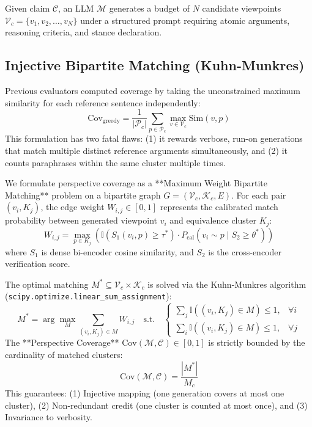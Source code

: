 \documentclass[11pt,a4paper]{article}
\begin{document}
Given claim $\mathcal{C}$, an LLM $\mathcal{M}$ generates a budget of $N$ candidate viewpoints $\mathcal{V}_c = \{v_1, v_2, \dots, v_N\}$ under a structured prompt requiring atomic arguments, reasoning criteria, and stance declaration.

\subsection{Injective Bipartite Matching (Kuhn-Munkres)}
Previous evaluators computed coverage by taking the unconstrained maximum similarity for each reference sentence independently:
\begin{equation}
    \text{Cov}_{\text{greedy}} = \frac{1}{|\mathcal{P}_c|} \sum_{p \in \mathcal{P}_c} \max_{v \in \mathcal{V}_c} \text{Sim}(v, p)
\end{equation}
This formulation has two fatal flaws: (1) it rewards verbose, run-on generations that match multiple distinct reference arguments simultaneously, and (2) it counts paraphrases within the same cluster multiple times.

We formulate perspective coverage as a **Maximum Weight Bipartite Matching** problem on a bipartite graph $G = (\mathcal{V}_c, \mathcal{K}_c, E)$. For each pair $(v_i, K_j)$, the edge weight $W_{i, j} \in [0, 1]$ represents the calibrated match probability between generated viewpoint $v_i$ and equivalence cluster $K_j$:
\begin{equation}
    W_{i, j} = \max_{p \in K_j} \left( \mathbb{I}(S_1(v_i, p) \ge \tau^*) \cdot P_{\text{cal}}(v_i \sim p \mid S_2 \ge \theta^*) \right)
\end{equation}
where $S_1$ is dense bi-encoder cosine similarity, and $S_2$ is the cross-encoder verification score.

The optimal matching $M^* \subseteq \mathcal{V}_c \times \mathcal{K}_c$ is solved via the Kuhn-Munkres algorithm (\texttt{scipy.optimize.linear\_sum\_assignment}):
\begin{equation}
    M^* = \arg\max_{M} \sum_{(v_i, K_j) \in M} W_{i, j} \quad \text{s.t.} \quad \begin{cases}
    \sum_j \mathbb{I}((v_i, K_j) \in M) \le 1, & \forall i \\
    \sum_i \mathbb{I}((v_i, K_j) \in M) \le 1, & \forall j
    \end{cases}
\end{equation}
The **Perspective Coverage** $\text{Cov}(\mathcal{M}, \mathcal{C}) \in [0, 1]$ is strictly bounded by the cardinality of matched clusters:
\begin{equation}
    \text{Cov}(\mathcal{M}, \mathcal{C}) = \frac{|M^*|}{M_c}
\end{equation}
This guarantees: (1) Injective mapping (one generation covers at most one cluster), (2) Non-redundant credit (one cluster is counted at most once), and (3) Invariance to verbosity.
\end{document}
